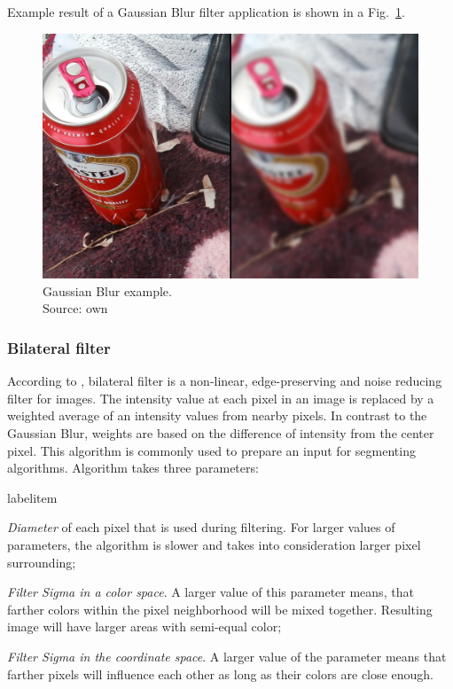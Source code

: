 \documentclass[a4paper,onecolumn,oneside,12pt]{memoir}
\makeatletter
\renewenvironment{itemize}{
  \begin{list}{  
  \csname labelitem\romannumeral\the\@listdepth\endcsname}{
  \setlength{\leftmargin}{1em}
	\setlength{\topsep}{6pt}%
	\setlength{\partopsep}{0pt}%
	\setlength{\parskip}{0pt}%
	\setlength{\parsep}{0pt}%
	\setlength{\itemsep}{0pt}}
}{
  \end{list}
}
\makeatother
\begin{document}
Example result of a Gaussian Blur filter application is shown in a Fig.~\ref{gaussianBlurExample}.

\begin{figure}[!ht]
\begin{center}
\includegraphics[scale=0.1]{images/GaussianBlurExample.jpg}
\caption{Gaussian Blur example. \\
Source: own}
\label{gaussianBlurExample}
\end{center}
\end{figure}

\subsubsection{Bilateral filter}

According to \cite{bilateralFilterWiki}, bilateral filter is a non-linear, edge-preserving and
noise reducing filter for images. The intensity value at each pixel in an image is replaced by a
weighted average of an intensity values from nearby pixels. In contrast to the Gaussian Blur, 
weights are based on the difference of intensity from the center pixel. This algorithm is commonly
used to prepare an input for segmenting algorithms. Algorithm takes three parameters:

\begin{itemize}
  \item \textit{Diameter} of each pixel that is used during filtering. For larger values of 
        parameters, the algorithm is slower and takes into consideration larger pixel surrounding;
  \item \textit{Filter Sigma in a color space}. A larger value of this parameter means, that farther
        colors within the pixel neighborhood will be mixed together. Resulting image will have
        larger areas with semi-equal color;
  \item \textit{Filter Sigma in the coordinate space}. A larger value of the parameter means that
        farther pixels will influence each other as long as their colors are close enough.
\end{itemize}
\end{document}
